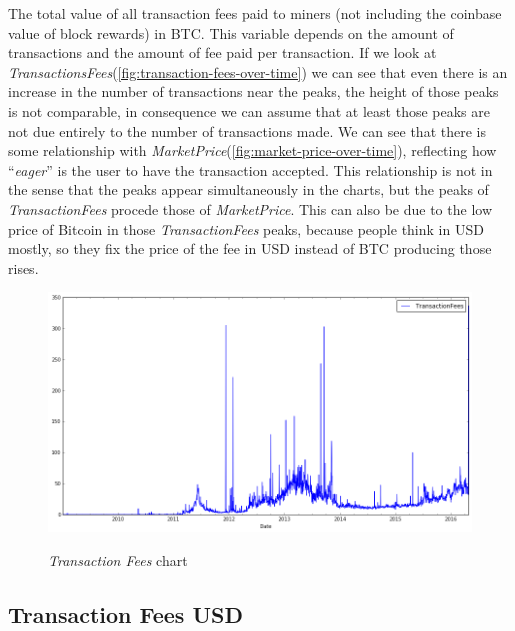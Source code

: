 The total value of all transaction fees paid to miners (not including
the coinbase value of block rewards) in BTC. This variable depends on
the amount of transactions and the amount of fee paid per transaction.
If we look at
\textit{TransactionsFees}(\autoref{fig:transaction-fees-over-time}) we
can see that even there is an increase in the number of transactions
near the peaks, the height of those peaks is not comparable, in
consequence we can assume that at least those peaks are not due
entirely to the number of transactions made. We can see that there is
some relationship with
\textit{MarketPrice}(\autoref{fig:market-price-over-time}), reflecting
how ``\textit{eager}'' is the user to have the transaction accepted.
This relationship is not in the sense that the peaks appear
simultaneously in the charts, but the peaks of
\textit{TransactionFees} procede those of \textit{MarketPrice}. This
can also be due to the low price of Bitcoin in those
\textit{TransactionFees} peaks, because people think in USD mostly, so
they fix the price of the fee in USD instead of BTC producing those
rises.

\begin{figure}[bth]
  \myfloatalign
  {\includegraphics[width=1\linewidth]
    {gfx/transaction-fees-over-time}}
  \caption{\textit{Transaction Fees} chart}
  \label{fig:transaction-fees-over-time}
\end{figure}


\subsection{Transaction Fees USD}
\label{sec:transaction-fees-usd}

